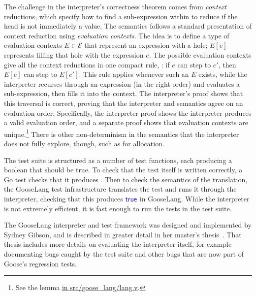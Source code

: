 The challenge in the interpreter's correctness theorem comes from \emph{context} reductions,
which specify how to find a sub-expression within  to reduce
if the head is not immediately a value. The semantics follows a standard
presentation of context reduction using \emph{evaluation contexts}. The
idea is to define a type of evaluation contexts $E \in \mathcal{E}$ that
represent an expression with a hole; $E[e]$ represents filling that hole with
the expression $e$. The possible evaluation
contexts give all the context reductions in one compact rule, : if $e$
can step to $e'$, then $E[e]$ can step to $E[e']$. This rule applies whenever
such an $E$ exists, while the
interpreter recurses through an expression (in the right order) and
evaluates a sub-expression, then fills it into the context. The interpreter's
proof shows that
this traversal is correct, proving that the interpreter and semantics agree on an
evaluation order. Specifically, the interpreter proof shows the interpreter
produces a valid evaluation order, and a separate proof shows that evaluation
contexts are unique.\footnote{See the lemma
\href{https://github.com/mit-pdos/perennial/blob/6f5ed5e7c2d3e8d657a0022c51e1d1e32a81e671/src/goose_lang/lang.v\#L1443-L1447}%
{ in src/goose\_lang/lang.v}.} There is other non-determinism in the semantics that the
interpreter does not fully explore, though, such as for allocation.

The test suite is structured as a number of test functions, each producing a
boolean that should be true. To check that the test itself is written correctly,
a Go test checks that it produces . Then to check the semantics of
the translation, the GooseLang test infrastructure translates the test and runs
it through the interpreter, checking that this produces $\mathsf{\textcolor{blue}{true}}$ in
GooseLang. While the interpreter is not extremely efficient, it is fast enough
to run the tests in the test suite.

The GooseLang interpreter and test framework was designed and implemented by
Sydney Gibson, and is described in greater detail in her master's
thesis~\cite{gibsons-meng}. That thesis includes more details on evaluating the
interpreter itself, for example documenting bugs caught by the test suite and
other bugs that are now part of Goose's regression tests.
